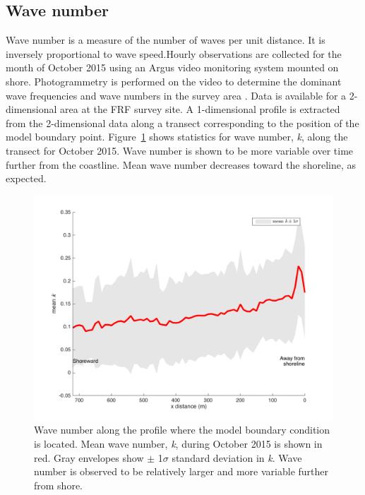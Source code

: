 \subsection{Wave number}

Wave number is a measure of the number of waves per unit distance. It is inversely proportional to wave speed.Hourly observations are collected for the month of October 2015 using an Argus video monitoring system mounted on shore. Photogrammetry is performed on the video to determine the dominant wave frequencies and wave numbers in the survey area \citep{holman2013}. Data is available for a 2-dimensional area at the FRF survey site. A 1-dimensional profile is extracted from the 2-dimensional data along a transect corresponding to the position of the model boundary point. Figure~\ref{k1Dmean} shows statistics for wave number, \textit{k}, along the transect for October 2015. Wave number is shown to be more variable over time further from the coastline. Mean wave number decreases toward the shoreline, as expected.



\begin{figure}[H]
\centering
\includegraphics[width=.55\linewidth]{img/k1Dmean_std.png}
\caption{Wave number along the profile where the model boundary condition is located. Mean wave number, \textit{k}, during October 2015 is shown in red. Gray envelopes show $\pm$ 1$\sigma$ standard deviation in \textit{k}. Wave number is observed to be relatively larger and more variable further from shore.}
\label{k1Dmean}
\end{figure}